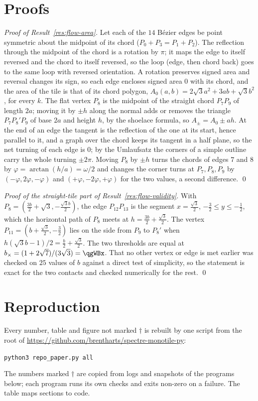 \documentclass[11pt]{article}
\theoremstyle{definition}
\begin{document}
\section{Proofs}\label{app:proofs}
\emph{Proof of Result~\ref{res:flow-area}.} Let each of the $14$ B\'ezier edges be point symmetric about the midpoint of its chord ($P_0+P_3=P_1+P_2$). The reflection through the midpoint of the chord is a rotation by $\pi$; it maps the edge to itself reversed and the chord to itself reversed, so the loop (edge, then chord back) goes to the same loop with reversed orientation. A rotation preserves signed area and reversal changes its sign, so each edge encloses signed area $0$ with its chord, and the area of the tile is that of its chord polygon, $A_0(a,b)=2\sqrt3a^2+3ab+\sqrt3b^2$, for every $k$. The flat vertex $P_8$ is the midpoint of the straight chord $P_7P_9$ of length $2a$; moving it by $\pm h$ along the normal adds or removes the triangle $P_7P_8'P_9$ of base $2a$ and height $h$, by the shoelace formula, so $A_\pm=A_0\pm ah$. At the end of an edge the tangent is the reflection of the one at its start, hence parallel to it, and a graph over the chord keeps its tangent in a half plane, so the net turning of each edge is $0$; by the Umlaufsatz the corners of a simple outline carry the whole turning $\pm2\pi$. Moving $P_8$ by $\pm h$ turns the chords of edges $7$ and $8$ by $\varphi=\arctan(h/a)=\omega/2$ and changes the corner turns at $P_7,P_8,P_9$ by $(-\varphi,2\varphi,-\varphi)$ and $(+\varphi,-2\varphi,+\varphi)$ for the two values, a second difference. \qed

\emph{Proof of the straight-tile part of Result~\ref{res:flow-validity}.} With $P_8=(\tfrac{3b}2+\sqrt3,-\tfrac{\sqrt3b}2)$, the edge $P_{12}P_{13}$ is the segment $x=\tfrac{\sqrt3}2$, $-\tfrac32\le y\le-\tfrac12$, which the horizontal path of $P_8$ meets at $h=\tfrac{3b}2+\tfrac{\sqrt3}2$. The vertex $P_{11}=(b+\tfrac{\sqrt3}2,-\tfrac32)$ lies on the side from $P_9$ to $P_8'$ when $h(\sqrt3b-1)/2=\tfrac b2+\tfrac{\sqrt3}2$. The two thresholds are equal at $b_\times=(1+2\sqrt7)/(3\sqrt3)=\qgWBx$. That no other vertex or edge is met earlier was checked on $25$ values of $b$ against a direct test of simplicity, so the statement is exact for the two contacts and checked numerically for the rest. \qed

\section{Reproduction}\label{app:repro}
Every number, table and figure not marked $\dagger$ is rebuilt by one script from the root of \url{https://github.com/brentharts/spectre-monotile-py}:
\begin{center}\texttt{python3 repo\_paper.py all}\end{center}
The numbers marked $\dagger$ are copied from logs and snapshots of the programs below; each program runs its own checks and exits non-zero on a failure. The table maps sections to code.
\end{document}
